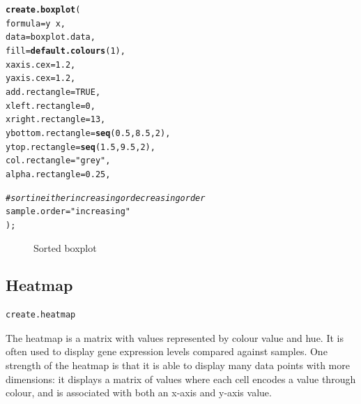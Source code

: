 \documentclass[letterpaper]{article}\usepackage[]{graphicx}\usepackage[]{color}
\makeatletter
\newcommand{\hlnum}[1]{\textcolor[rgb]{0.686,0.059,0.569}{#1}}%
\newcommand{\hlstr}[1]{\textcolor[rgb]{0.192,0.494,0.8}{#1}}%
\newcommand{\hlcom}[1]{\textcolor[rgb]{0.678,0.584,0.686}{\textit{#1}}}%
\newcommand{\hlopt}[1]{\textcolor[rgb]{0,0,0}{#1}}%
\newcommand{\hlstd}[1]{\textcolor[rgb]{0.345,0.345,0.345}{#1}}%
\newcommand{\hlkwc}[1]{\textcolor[rgb]{0.333,0.667,0.333}{#1}}%
\newcommand{\hlkwd}[1]{\textcolor[rgb]{0.737,0.353,0.396}{\textbf{#1}}}%
\newenvironment{kframe}{%
 \def\at@end@of@kframe{}%
 \ifinner\ifhmode%
  \def\at@end@of@kframe{\end{minipage}}%
  \begin{minipage}{\columnwidth}%
 \fi\fi%
 \def\FrameCommand##1{\hskip\@totalleftmargin \hskip-\fboxsep
 \colorbox{shadecolor}{##1}\hskip-\fboxsep
     \hskip-\linewidth \hskip-\@totalleftmargin \hskip\columnwidth}%
 \MakeFramed {\advance\hsize-\width
   \@totalleftmargin\z@ \linewidth\hsize
   \@setminipage}}%
 {\par\unskip\endMakeFramed%
 \at@end@of@kframe}
\newenvironment{knitrout}{}{} %
\makeatother
\begin{document}
\begin{knitrout}
\color{fgcolor}\begin{kframe}
\begin{alltt}
\hlkwd{create.boxplot}\hlstd{(}
    \hlkwc{formula} \hlstd{= y} \hlopt{~} \hlstd{x,}
    \hlkwc{data} \hlstd{= boxplot.data,}
    \hlkwc{fill} \hlstd{=} \hlkwd{default.colours}\hlstd{(}\hlnum{1}\hlstd{),}
    \hlkwc{xaxis.cex} \hlstd{=} \hlnum{1.2}\hlstd{,}
    \hlkwc{yaxis.cex} \hlstd{=} \hlnum{1.2}\hlstd{,}
    \hlkwc{add.rectangle} \hlstd{=} \hlnum{TRUE}\hlstd{,}
    \hlkwc{xleft.rectangle} \hlstd{=} \hlnum{0}\hlstd{,}
    \hlkwc{xright.rectangle} \hlstd{=} \hlnum{13}\hlstd{,}
    \hlkwc{ybottom.rectangle} \hlstd{=} \hlkwd{seq}\hlstd{(}\hlnum{0.5}\hlstd{,} \hlnum{8.5}\hlstd{,} \hlnum{2}\hlstd{),}
    \hlkwc{ytop.rectangle} \hlstd{=} \hlkwd{seq}\hlstd{(}\hlnum{1.5}\hlstd{,} \hlnum{9.5}\hlstd{,} \hlnum{2}\hlstd{),}
    \hlkwc{col.rectangle} \hlstd{=} \hlstr{"grey"}\hlstd{,}
    \hlkwc{alpha.rectangle} \hlstd{=} \hlnum{0.25}\hlstd{,}

    \hlcom{# sort in either increasing or decreasing order}
    \hlkwc{sample.order} \hlstd{=} \hlstr{"increasing"}
    \hlstd{);}
\end{alltt}
\end{kframe}\begin{figure}

{\centering {} 

}

\caption[Sorted boxplot]{Sorted boxplot\label{fig:boxplot4}}
\end{figure}


\end{knitrout}

\subsection{Heatmap}
\begin{verbatim}
create.heatmap
\end{verbatim}

The heatmap is a matrix with values represented by colour value and hue. It is often used to display gene expression levels compared against samples. One strength of the heatmap is that it is able to display many data points with more dimensions: it displays a matrix of values where each cell encodes a value through colour, and is associated with both an x-axis and y-axis value. 
\end{document}
